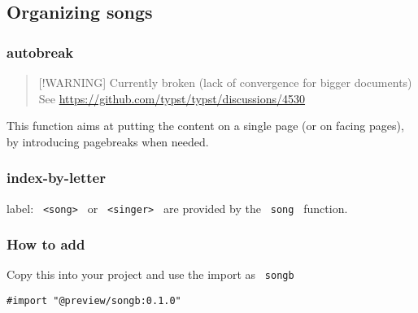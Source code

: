 \subsection{Organizing songs}\label{organizing-songs}

\subsubsection{autobreak}\label{autobreak}

\begin{quote}
{[}!WARNING{]} Currently broken (lack of convergence for bigger
documents) See \url{https://github.com/typst/typst/discussions/4530}
\end{quote}

This function aims at putting the content on a single page (or on facing
pages), by introducing pagebreaks when needed.

\begin{Shaded}
\begin{Highlighting}[]
\end{Highlighting}
\end{Shaded}

\subsubsection{index-by-letter}\label{index-by-letter}

\begin{Shaded}
\begin{Highlighting}[]
\end{Highlighting}
\end{Shaded}

label: \texttt{\ \textless{}song\textgreater{}\ } or
\texttt{\ \textless{}singer\textgreater{}\ } are provided by the
\texttt{\ song\ } function.

\subsubsection{How to add}\label{how-to-add}

Copy this into your project and use the import as \texttt{\ songb\ }

\begin{verbatim}
#import "@preview/songb:0.1.0"
\end{verbatim}




